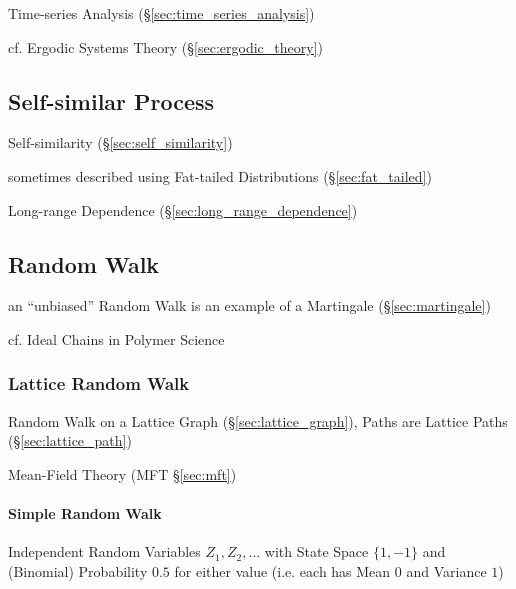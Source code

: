 \fist Time-series Analysis (\S\ref{sec:time_series_analysis})

\fist cf. Ergodic Systems Theory (\S\ref{sec:ergodic_theory})



\subsection{Self-similar Process}\label{sec:self_similar}

Self-similarity (\S\ref{sec:self_similarity})

sometimes described using Fat-tailed Distributions (\S\ref{sec:fat_tailed})

Long-range Dependence (\S\ref{sec:long_range_dependence})



\subsection{Random Walk}\label{sec:random_walk}


an ``unbiased'' Random Walk is an example of a Martingale
(\S\ref{sec:martingale})

cf. Ideal Chains in Polymer Science



\subsubsection{Lattice Random Walk}\label{sec:lattice_random_walk}

Random Walk on a Lattice Graph (\S\ref{sec:lattice_graph}), Paths are Lattice
Paths (\S\ref{sec:lattice_path})

\fist Mean-Field Theory (MFT \S\ref{sec:mft})



\paragraph{Simple Random Walk}\label{sec:simple_random_walk}\hfill

Independent Random Variables $Z_1, Z_2, \ldots$ with State Space $\{1, -1\}$ and
(Binomial) Probability $0.5$ for either value (i.e. each has Mean $0$ and
Variance $1$)

